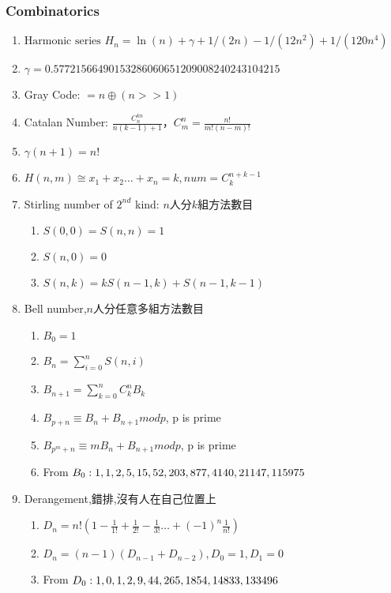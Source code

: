 \subsubsection{Combinatorics}
\begin{enumerate}
\itemsep = -3pt
  \item $\text{Harmonic series } H_n = \ln(n) + \gamma + 1/(2n) - 1/(12n^2) + 1/(120n^4)$
  \item $ \gamma = 0.57721566490153286060651209008240243104215$
  \item Gray Code: $=n\oplus (n>>1)$
  \item Catalan Number: $\frac{C_{n}^{kn}}{n(k-1)+1}$，$C_{m}^{n}=\frac{n!}{m!(n-m)!}$
  \item $\gamma(n + 1) = n!$
  \item $H(n,m)\cong x_1+x_2\ldots +x_n=k, num=C_{k}^{n+k-1}$
  \item Stirling number of $2^{nd}$ kind: $n$人分$k$組方法數目
	\begin{enumerate}\itemsep = -2pt
		\item $S(0,0)=S(n,n)=1$
		\item $S(n,0)=0$
		\item $S(n,k)=kS(n-1,k)+S(n-1,k-1)$
	\end{enumerate}
  \item Bell number,$n$人分任意多組方法數目
	\begin{enumerate}\itemsep = -2pt
		\item $B_0=1$
		\item $B_n=\sum_{i=0}^nS(n,i)$
		\item $B_{n+1}=\sum_{k=0}^{n} C_k^n B_k$
		\item $B_{p+n}\equiv B{_n}+B_{n+1} mod p$, p is prime
		\item $B_{p^m+n}\equiv mB{_n}+B_{n+1} mod p$, p is prime
		\item From $B_0: 1,1,2,5,15,52,\\203,877,4140,21147,115975$
	\end{enumerate}
\item Derangement,錯排,沒有人在自己位置上
	\begin{enumerate}\itemsep = -2pt
		\item $D_n=n!(1-\frac{1}{1!}+\frac{1}{2!}-\frac{1}{3!}\ldots +(-1)^n\frac{1}{n!})$
		\item $D_n=(n-1)(D_{n-1}+D_{n-2}),D_0=1,D_1=0$
		\item From $D_0: 1,0,1,2,9,44,\\265,1854,14833,133496$
	\end{enumerate}

\end{enumerate}
